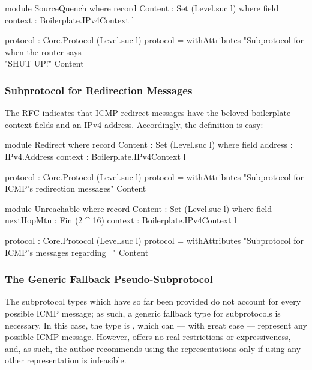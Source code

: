 \documentclass{report}
\begin{document}
\begin{itemize}
\begin{code}
    module SourceQuench where
      record Content : Set (Level.suc l) where
        field
          context : Boilerplate.IPv4Context l

      protocol : Core.Protocol (Level.suc l)
      protocol = withAttributes "Subprotocol for when the router says \
                                \\"SHUT UP!\""
                                Content
\end{code}

\subsubsection{Subprotocol for Redirection Messages}
The RFC indicates that ICMP redirect messages have the beloved boilerplate context fields and an IPv4 address.  Accordingly, the definition is easy:

\begin{code}
    module Redirect where
      record Content : Set (Level.suc l) where
        field
          address : IPv4.Address
          context : Boilerplate.IPv4Context l

      protocol : Core.Protocol (Level.suc l)
      protocol = withAttributes "Subprotocol for ICMP's redirection messages"
                                Content
\end{code}

\begin{code}
    module Unreachable where
      record Content : Set (Level.suc l) where
        field
          nextHopMtu : Fin (2 ^ 16)
          context : Boilerplate.IPv4Context l

      protocol : Core.Protocol (Level.suc l)
      protocol = withAttributes "Subprotocol for ICMP's messages regarding \
                                \unreachability"
                                Content
\end{code}

\subsubsection{The Generic Fallback Pseudo-Subprotocol}
The subprotocol types which have so far been provided do not account for every possible ICMP message; as such, a generic fallback type for subprotocols is necessary.  In this case, the type is , which can --- with great ease --- represent any possible ICMP message.  However,  offers no real restrictions or expressiveness, and, as such, the author recommends using the  representations only if using any other representation is infeasible.


\end{itemize}
\end{document}
